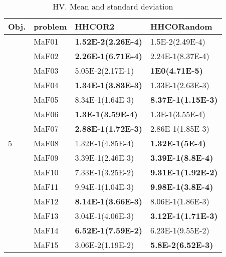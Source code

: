 \documentclass[]{article}
\begin{document}
\begin{table}
\caption{HV. Mean and standard deviation}
\label{table:mean.HV}
\centering
\begin{footnotesize}
\begin{tabular}{|l|l|l|l|}
\hline
Obj. & problem  & HHCOR2 & HHCORandom \\ \hline

\multirow{15}{*}{5} & MaF01 & \cellcolor{gray95} {\bf 1.52E-2(2.26E-4)} & 1.5E-2(2.49E-4)\\
 & MaF02 & \cellcolor{gray95} {\bf 2.26E-1(6.71E-4)} & 2.24E-1(8.37E-4)\\
 & MaF03 & 5.05E-2(2.17E-1) & \cellcolor{gray95} {\bf 1E0(4.71E-5)}\\
 & MaF04 & \cellcolor{gray95} {\bf 1.34E-1(3.83E-3)} & \cellcolor{gray95} 1.33E-1(2.63E-3)\\
 & MaF05 & 8.34E-1(1.64E-3) & \cellcolor{gray95} {\bf 8.37E-1(1.15E-3)}\\
 & MaF06 & \cellcolor{gray95} {\bf 1.3E-1(3.59E-4)} & \cellcolor{gray95} 1.3E-1(3.55E-4)\\
 & MaF07 & \cellcolor{gray95} {\bf 2.88E-1(1.72E-3)} & 2.86E-1(1.85E-3)\\
 & MaF08 & \cellcolor{gray95} 1.32E-1(4.85E-4) & \cellcolor{gray95} {\bf 1.32E-1(5E-4)}\\
 & MaF09 & \cellcolor{gray95} 3.39E-1(2.46E-3) & \cellcolor{gray95} {\bf 3.39E-1(8.8E-4)}\\
 & MaF10 & 7.33E-1(3.25E-2) & \cellcolor{gray95} {\bf 9.31E-1(1.92E-2)}\\
 & MaF11 & 9.94E-1(1.04E-3) & \cellcolor{gray95} {\bf 9.98E-1(3.8E-4)}\\
 & MaF12 & \cellcolor{gray95} {\bf 8.14E-1(3.66E-3)} & 8.06E-1(1.86E-3)\\
 & MaF13 & 3.04E-1(4.06E-3) & \cellcolor{gray95} {\bf 3.12E-1(1.71E-3)}\\
 & MaF14 & \cellcolor{gray95} {\bf 6.52E-1(7.59E-2)} & \cellcolor{gray95} 6.23E-1(9.55E-2)\\
 & MaF15 & 3.06E-2(1.19E-2) & \cellcolor{gray95} {\bf 5.8E-2(6.52E-3)}\\
\hline


\end{tabular}
\end{footnotesize}
\end{table}
\end{document}
